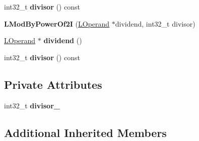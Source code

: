 \begin{DoxyCompactItemize}
\item 
int32\+\_\+t {\bfseries divisor} () const \hypertarget{classv8_1_1internal_1_1_l_mod_by_power_of2_i_a9edbee4d9db4a80578d3182db42ecd95}{}\label{classv8_1_1internal_1_1_l_mod_by_power_of2_i_a9edbee4d9db4a80578d3182db42ecd95}

\item 
{\bfseries L\+Mod\+By\+Power\+Of2I} (\hyperlink{classv8_1_1internal_1_1_l_operand}{L\+Operand} $\ast$dividend, int32\+\_\+t divisor)\hypertarget{classv8_1_1internal_1_1_l_mod_by_power_of2_i_ae24bf80084199df5a60259d7c07cdcbf}{}\label{classv8_1_1internal_1_1_l_mod_by_power_of2_i_ae24bf80084199df5a60259d7c07cdcbf}

\item 
\hyperlink{classv8_1_1internal_1_1_l_operand}{L\+Operand} $\ast$ {\bfseries dividend} ()\hypertarget{classv8_1_1internal_1_1_l_mod_by_power_of2_i_ac13f14bd9208161205a94315c67fab0c}{}\label{classv8_1_1internal_1_1_l_mod_by_power_of2_i_ac13f14bd9208161205a94315c67fab0c}

\item 
int32\+\_\+t {\bfseries divisor} () const \hypertarget{classv8_1_1internal_1_1_l_mod_by_power_of2_i_a9edbee4d9db4a80578d3182db42ecd95}{}\label{classv8_1_1internal_1_1_l_mod_by_power_of2_i_a9edbee4d9db4a80578d3182db42ecd95}

\end{DoxyCompactItemize}
\subsection*{Private Attributes}
\begin{DoxyCompactItemize}
\item 
int32\+\_\+t {\bfseries divisor\+\_\+}\hypertarget{classv8_1_1internal_1_1_l_mod_by_power_of2_i_ab765778bd4d6b60549569307f1a54bc0}{}\label{classv8_1_1internal_1_1_l_mod_by_power_of2_i_ab765778bd4d6b60549569307f1a54bc0}

\end{DoxyCompactItemize}
\subsection*{Additional Inherited Members}


